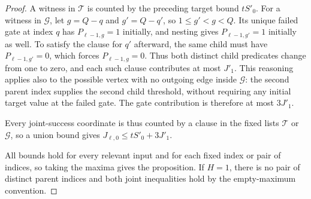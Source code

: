 \begin{proof}
A witness in $\mathcal T$ is counted by the preceding target bound
$tS'_0$.  For a witness in $\mathcal G$, let $g=Q-q$ and
$g'=Q-q'$, so $1\leq g'<g<Q$.  Its unique failed gate at index $q$
has $P_{\ell-1,g}=1$ initially, and nesting gives
$P_{\ell-1,g'}=1$ initially as well.  To satisfy the clause for
$q'$ afterward, the same child must have $P_{\ell-1,g'}=0$, which
forces $P_{\ell-1,g}=0$.  Thus both distinct child predicates change
from one to zero, and each such clause contributes at most $J'_1$.
This reasoning applies also to the possible vertex with no outgoing
edge inside $\mathcal G$: the second parent index supplies the
second child threshold, without requiring any initial target value
at the failed gate.  The gate contribution is therefore at most
$3J'_1$.

Every joint-success coordinate is thus counted by a clause in the fixed
lists $\mathcal T$ or $\mathcal G$, so a union bound gives
$J_{\ell,0}\leq tS'_0+3J'_1$.

All bounds hold for every relevant input and for each fixed index or
pair of indices, so taking the maxima gives the proposition.  If
$H=1$, there is no pair of distinct parent indices and both joint
inequalities hold by the empty-maximum convention.
\end{proof}
